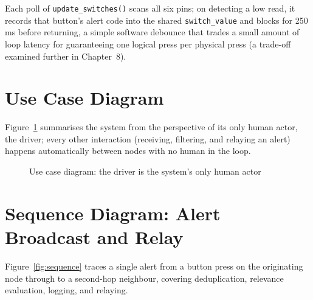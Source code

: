 \documentclass[12pt,a4paper]{report}
\begin{document}
Each poll of \texttt{update\_switches()} scans all six pins; on detecting a low read, it records that button's alert code into the shared \texttt{switch\_value} and blocks for 250\,ms before returning, a simple software debounce that trades a small amount of loop latency for guaranteeing one logical press per physical press (a trade-off examined further in Chapter~8).

\section{Use Case Diagram}
Figure~\ref{fig:usecase} summarises the system from the perspective of its only human actor, the driver; every other interaction (receiving, filtering, and relaying an alert) happens automatically between nodes with no human in the loop.

\begin{figure}[H]
\centering
{}
\caption{Use case diagram: the driver is the system's only human actor}
\label{fig:usecase}
\end{figure}

\section{Sequence Diagram: Alert Broadcast and Relay}
Figure~\ref{fig:sequence} traces a single alert from a button press on the originating node through to a second-hop neighbour, covering deduplication, relevance evaluation, logging, and relaying.
\end{document}
